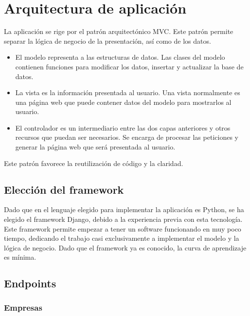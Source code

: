 \documentclass[12pt,a4paperpaper,]{report}
\providecommand{\tightlist}{%
  \setlength{\itemsep}{0pt}\setlength{\parskip}{0pt}}
\begin{document}
\section{Arquitectura de
aplicación}\label{arquitectura-de-aplicaciuxf3n}

La aplicación se rige por el patrón arquitectónico MVC. Este patrón
permite separar la lógica de negocio de la presentación, así como de los
datos.

\begin{itemize}
\tightlist
\item
  El modelo representa a las estructuras de datos. Las clases del modelo
  contienen funciones para modificar los datos, insertar y actualizar la
  base de datos.
\item
  La vista es la información presentada al usuario. Una vista
  normalmente es una página web que puede contener datos del modelo para
  mostrarlos al usuario.
\item
  El controlador es un intermediario entre las dos capas anteriores y
  otros recursos que puedan ser necesarios. Se encarga de procesar las
  peticiones y generar la página web que será presentada al usuario.
\end{itemize}

Este patrón favorece la reutilización de código y la claridad.

\subsection{Elección del framework}\label{elecciuxf3n-del-framework}

Dado que en el lenguaje elegido para implementar la aplicación es
Python, se ha elegido el framework Django, debido a la experiencia
previa con esta tecnología. Este framework permite empezar a tener un
software funcionando en muy poco tiempo, dedicando el trabajo casi
exclusivamente a implementar el modelo y la lógica de negocio. Dado que
el framework ya es conocido, la curva de aprendizaje es mínima.

\subsection{Endpoints}\label{endpoints}

\subsubsection{Empresas}\label{empresas}
\end{document}
